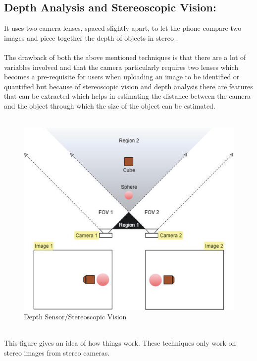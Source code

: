 \subsection{Depth Analysis and Stereoscopic Vision:}
It uses two camera lenses, spaced slightly apart, to let the phone compare two images and piece together the depth of objects in stereo \cite{chaim}.\\
\\
The drawback of both the above mentioned techniques is that there are a lot of variables involved and that the camera particularly requires two lenses which becomes a pre-requisite for users when uploading an image to be identified or quantified but because of stereoscopic vision and depth analysis there are features that can be extracted which helps in estimating the distance between the camera and the object through which the size of the object can be estimated. \\
\\
\begin{figure}[!hb]
   \centering
   \includegraphics[scale=0.8]{images/q3.png}
   \caption{Depth Sensor/Stereoscopic Vision}\label{fig:picture}
\end{figure}
\\
This figure gives an idea of how things work. These techniques only work on stereo images from stereo cameras.
